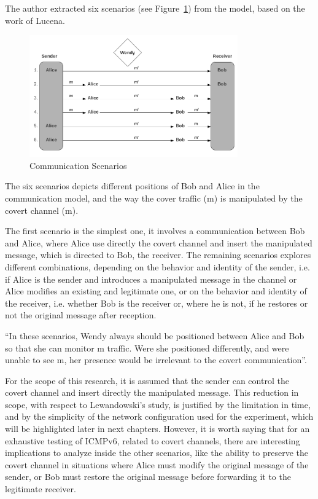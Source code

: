 \documentclass[12pt]{article}
\begin{document}
The author extracted six scenarios (see Figure~\ref{fig:commScenarios}) from the model, based on the work of Lucena\cite{lucena}.

\begin{figure}[ht] 
\begin{center}
\includegraphics[width=0.8\textwidth]{communicationScenarios}
\caption{Communication Scenarios\cite{lewandowski}}
\label{fig:commScenarios}
\end{center}
\end{figure}

The six scenarios depicts different positions of Bob and Alice in the communication model, and the way the cover traffic (m) is manipulated by the covert channel (m\textprime).

The first scenario is the simplest one, it involves a communication between Bob and Alice, where Alice use directly the covert channel and insert the manipulated message, which is directed to Bob, the receiver. The remaining scenarios explores different combinations, depending on the behavior and identity of the sender, i.e. if Alice is the sender and introduces a manipulated message in the channel or Alice modifies an existing and legitimate one, or on the behavior and identity of the receiver, i.e. whether Bob is the receiver or, where he is not, if he restores or not the original message after reception.

``In these scenarios, Wendy always should be positioned between Alice and Bob so that she can monitor m\textprime\hspace{2pt} traffic. Were she positioned differently, and were unable to see m\textprime, her presence would be irrelevant to the covert communication''\cite{lewandowski}.

For the scope of this research, it is assumed that the sender can control the covert channel and insert directly the manipulated message. This reduction in scope, with respect to Lewandowski's study, is justified by the limitation in time, and by the simplicity of the network configuration used for the experiment, which will be highlighted later in next chapters. However, it is worth saying that for an exhaustive testing of ICMPv6, related to covert channels, there are interesting implications to analyze inside the other scenarios, like the ability to preserve the covert channel in situations where Alice must modify the original message of the sender, or Bob must restore the original message before forwarding it to the legitimate receiver.
\end{document}

